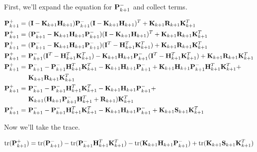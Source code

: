 First, we'll expand the equation for $\mathbf{P}_{k+1}^-$ and collect terms.

\begin{align}
  \mathbf{P}_{k+1}^+ =~& (\mathbf{I} - \mathbf{K}_{k+1}\mathbf{H}_{k+1})\mathbf{P}_{k+1}^-
    (\mathbf{I} - \mathbf{K}_{k+1}\mathbf{H}_{k+1})^T + \mathbf{K}_{k+1}\mathbf{R}_{k+1}
    \mathbf{K}_{k+1}^T \nonumber \\
  \mathbf{P}_{k+1}^+ =~&
    (\mathbf{P}_{k+1}^- - \mathbf{K}_{k+1}\mathbf{H}_{k+1}\mathbf{P}_{k+1}^-)
    (\mathbf{I} - \mathbf{K}_{k+1}\mathbf{H}_{k+1})^T + \mathbf{K}_{k+1}\mathbf{R}_{k+1}
    \mathbf{K}_{k+1}^T \nonumber \\
  \mathbf{P}_{k+1}^+ =~&
    (\mathbf{P}_{k+1}^- - \mathbf{K}_{k+1}\mathbf{H}_{k+1}\mathbf{P}_{k+1}^-)
    (\mathbf{I}^T - \mathbf{H}_{k+1}^T\mathbf{K}_{k+1}^T) +
    \mathbf{K}_{k+1}\mathbf{R}_{k+1} \mathbf{K}_{k+1}^T \nonumber \\
  \mathbf{P}_{k+1}^+ =~&
    \mathbf{P}_{k+1}^-(\mathbf{I}^T - \mathbf{H}_{k+1}^T\mathbf{K}_{k+1}^T) -
    \mathbf{K}_{k+1}\mathbf{H}_{k+1}\mathbf{P}_{k+1}^-
    (\mathbf{I}^T - \mathbf{H}_{k+1}^T\mathbf{K}_{k+1}^T) +
    \mathbf{K}_{k+1}\mathbf{R}_{k+1} \mathbf{K}_{k+1}^T \nonumber \\
  \mathbf{P}_{k+1}^+ =~&
    \mathbf{P}_{k+1}^- - \mathbf{P}_{k+1}^-\mathbf{H}_{k+1}^T\mathbf{K}_{k+1}^T -
    \mathbf{K}_{k+1}\mathbf{H}_{k+1}\mathbf{P}_{k+1}^- +
    \mathbf{K}_{k+1}\mathbf{H}_{k+1}\mathbf{P}_{k+1}^-\mathbf{H}_{k+1}^T\mathbf{K}_{k+1}^T +
      \nonumber \\
    &\mathbf{K}_{k+1}\mathbf{R}_{k+1} \mathbf{K}_{k+1}^T \nonumber \\
  \mathbf{P}_{k+1}^+ =~&
    \mathbf{P}_{k+1}^- - \mathbf{P}_{k+1}^-\mathbf{H}_{k+1}^T\mathbf{K}_{k+1}^T -
    \mathbf{K}_{k+1}\mathbf{H}_{k+1}\mathbf{P}_{k+1}^- + \nonumber \\
    &\mathbf{K}_{k+1}(\mathbf{H}_{k+1}\mathbf{P}_{k+1}^-\mathbf{H}_{k+1}^T +
    \mathbf{R}_{k+1})\mathbf{K}_{k+1}^T \nonumber \\
  \mathbf{P}_{k+1}^+ =~&
    \mathbf{P}_{k+1}^- - \mathbf{P}_{k+1}^-\mathbf{H}_{k+1}^T\mathbf{K}_{k+1}^T -
    \mathbf{K}_{k+1}\mathbf{H}_{k+1}\mathbf{P}_{k+1}^- +
    \mathbf{K}_{k+1}\mathbf{S}_{k+1}\mathbf{K}_{k+1}^T \label{eq:post_p_update}
\end{align}

Now we'll take the trace.

\begin{equation*}
  \operatorname{tr}(\mathbf{P}_{k+1}^+) =
    \operatorname{tr}(\mathbf{P}_{k+1}^-) - \operatorname{tr}(\mathbf{P}_{k+1}^-\mathbf{H}_{k+1}^T\mathbf{K}_{k+1}^T) -
    \operatorname{tr}(\mathbf{K}_{k+1}\mathbf{H}_{k+1}\mathbf{P}_{k+1}^-) +
    \operatorname{tr}(\mathbf{K}_{k+1}\mathbf{S}_{k+1}\mathbf{K}_{k+1}^T)
\end{equation*}

